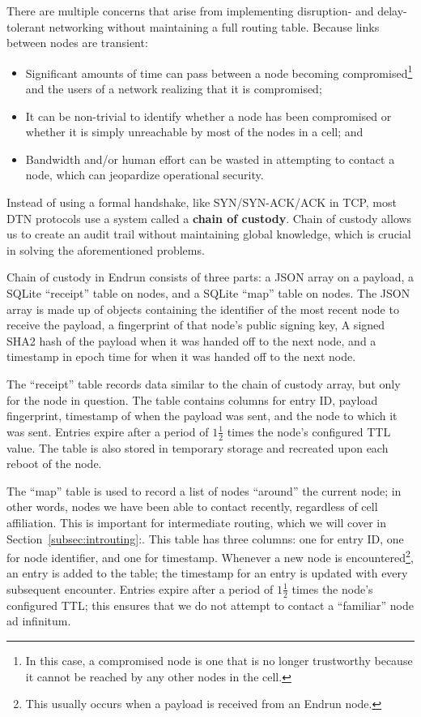 \documentclass[12pt]{article}
\begin{document}
  There are multiple concerns that arise from implementing disruption- and delay-tolerant networking without maintaining a full routing table. Because links between nodes are transient:
  \begin{itemize}
  
      \item Significant amounts of time can pass between a node becoming compromised\footnote{In this case, a compromised node is one that is no longer trustworthy because it cannot be reached by any other nodes in the cell.} and the users of a network realizing that it is compromised;
      \item It can be non-trivial to identify whether a node has been compromised or whether it is simply unreachable by most of the nodes in a cell; and
      \item Bandwidth and/or human effort can be wasted in attempting to contact a node, which can jeopardize operational security.
      
      \end{itemize}
    
  Instead of using a formal handshake, like SYN/SYN-ACK/ACK in TCP, most DTN protocols use a system called a \textbf{chain of custody}. Chain of custody allows us to create an audit trail without maintaining global knowledge, which is crucial in solving the aforementioned problems.
  
  Chain of custody in Endrun consists of three parts: a JSON array on a payload, a SQLite ``receipt'' table on nodes, and a SQLite ``map'' table on nodes. The JSON array is made up of objects containing the identifier of the most recent node to receive the payload, a fingerprint of that node's public signing key, A signed SHA2 hash of the payload when it was handed off to the next node, and a timestamp in epoch time for when it was handed off to the next node. 
  
  The ``receipt'' table records data similar to the chain of custody array, but only for the node in question. The table contains columns for entry ID, payload fingerprint, timestamp of when the payload was sent, and the node to which it was sent. Entries expire after a period of $1\frac{1}{2}$ times the node's configured TTL value. The table is also stored in temporary storage and recreated upon each reboot of the node.
  
  The ``map'' table is used to record a list of nodes ``around'' the current node; in other words, nodes we have been able to contact recently, regardless of cell affiliation. This is important for intermediate routing, which we will cover in Section~\ref{subsec:introuting}:. This table has three columns: one for entry ID, one for node identifier, and one for timestamp.  Whenever a new node is encountered\footnote{This usually occurs when a payload is received from an Endrun node.}, an entry is added to the table; the timestamp for an entry is updated with every subsequent encounter. Entries expire after a period of $1\frac{1}{2}$ times the node's configured TTL; this ensures that we do not attempt to contact a ``familiar'' node ad infinitum.
  
\end{document}
